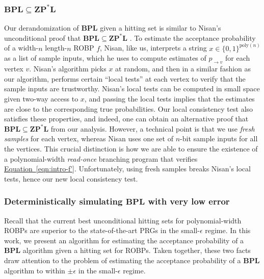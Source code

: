 \documentclass[11pt]{article}
\numberwithin{equation}{section}
\theoremstyle{definition}
\theoremstyle{plain}
\newcommand{\expeqref}[2]{\hyperref[#2]{#1~\eqref{#2}}}
\begin{document}
\subsubsection{$\mathbf{BPL}\subseteq \mathbf{ZP}^*\mathbf{L}$}
Our derandomization of $\mathbf{BPL}$ given a hitting set is similar to Nisan's unconditional proof that $\mathbf{BPL} \subseteq \mathbf{ZP}^* \mathbf{L}$ \cite{Nis93}. To estimate the acceptance probability of a width-$n$ length-$n$ ROBP $f$, Nisan, like us, interprets a string $x \in \{0, 1\}^{\text{poly}(n)}$ as a list of sample inputs, which he uses to compute estimates of $p_{\to v}$ for each vertex $v$. Nisan's algorithm picks $x$ at random, and then in a similar fashion as our algorithm, performs certain ``local tests'' at each vertex to verify that the sample inputs are trustworthy. Nisan's local tests can be computed in small space given two-way access to $x$, and passing the local tests implies that the estimates are close to the corresponding true probabilities. Our local consistency test also satisfies these properties, and indeed, one can obtain an alternative proof that $\mathbf{BPL} \subseteq \mathbf{ZP}^* \mathbf{L}$ from our analysis. However, a technical point is that we use \emph{fresh samples} for each vertex, whereas Nisan uses one set of $n$-bit sample inputs for all the vertices. This crucial distinction is how we are able to ensure the existence of a polynomial-width \emph{read-once} branching program that verifies \expeqref{Equation}{eqn:intro-f'}. Unfortunately, using fresh samples breaks Nisan's local tests, hence our new local consistency test.

\subsubsection{Deterministically simulating $\mathbf{BPL}$ with very low error}

Recall that the current best unconditional hitting sets for polynomial-width ROBPs \cite{BCG20, HZ20, CL20, CDRSTS21, PV21, Hoz21} are superior to the state-of-the-art PRGs \cite{Nis92} in the small-$\epsilon$ regime. In this work, we present an algorithm for estimating the acceptance probability of a $\mathbf{BPL}$ algorithm given a hitting set for ROBPs. Taken together, these two facts draw attention to the problem of estimating the acceptance probability of a $\mathbf{BPL}$ algorithm to within $\pm \epsilon$ in the small-$\epsilon$ regime.
\end{document}
